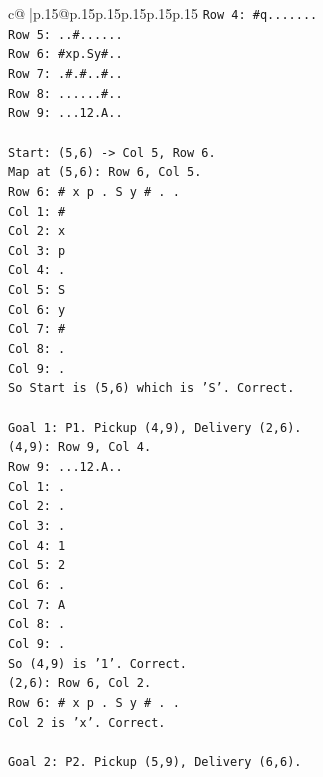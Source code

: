 \documentclass{article}
\begin{document}
{\begin{supertabular}{c@{$\;$}|p{.15\linewidth}@{}p{.15\linewidth}p{.15\linewidth}p{.15\linewidth}p{.15\linewidth}p{.15\linewidth}}
{{{\texttt{Row 4: \#q.......} \\
\texttt{Row 5: ..\#......} \\
\texttt{Row 6: \#xp.Sy\#..} \\
\texttt{Row 7: .\#.\#..\#..} \\
\texttt{Row 8: ......\#..} \\
\texttt{Row 9: ...12.A..} \\
\\ 
\texttt{Start: (5,6) {-}> Col 5, Row 6.} \\
\texttt{Map at (5,6): Row 6, Col 5.} \\
\texttt{Row 6: \# x p . S y \# . .} \\
\texttt{Col 1: \#} \\
\texttt{Col 2: x} \\
\texttt{Col 3: p} \\
\texttt{Col 4: .} \\
\texttt{Col 5: S} \\
\texttt{Col 6: y} \\
\texttt{Col 7: \#} \\
\texttt{Col 8: .} \\
\texttt{Col 9: .} \\
\texttt{So Start is (5,6) which is 'S'. Correct.} \\
\\ 
\texttt{Goal 1: P1. Pickup (4,9), Delivery (2,6).} \\
\texttt{(4,9): Row 9, Col 4.} \\
\texttt{Row 9: ...12.A..} \\
\texttt{Col 1: .} \\
\texttt{Col 2: .} \\
\texttt{Col 3: .} \\
\texttt{Col 4: 1} \\
\texttt{Col 5: 2} \\
\texttt{Col 6: .} \\
\texttt{Col 7: A} \\
\texttt{Col 8: .} \\
\texttt{Col 9: .} \\
\texttt{So (4,9) is '1'. Correct.} \\
\texttt{(2,6): Row 6, Col 2.} \\
\texttt{Row 6: \# x p . S y \# . .} \\
\texttt{Col 2 is 'x'. Correct.} \\
\\ 
\texttt{Goal 2: P2. Pickup (5,9), Delivery (6,6).} \\
}}}
\end{supertabular}}
\end{document}
